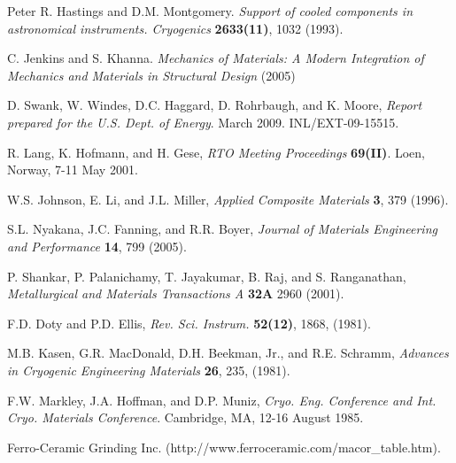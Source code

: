 \documentclass[final]{svjour2}
\begin{document}
\begin{thebibliography}{99}

Peter R. Hastings and D.M. Montgomery. {\it Support of cooled components in astronomical instruments. Cryogenics} \textbf{2633(11)}, 1032 (1993).

C. Jenkins and S. Khanna. {\it Mechanics of Materials: A Modern Integration of Mechanics and Materials in Structural Design} (2005)



D. Swank, W. Windes, D.C. Haggard, D. Rohrbaugh, and K. Moore, {\it Report prepared for the U.S. Dept. of Energy}. March 2009. INL/EXT-09-15515.

R. Lang, K. Hofmann, and H. Gese, {\it RTO Meeting Proceedings} \textbf{69(II)}. Loen, Norway, 7-11 May 2001.

W.S. Johnson, E. Li, and J.L. Miller, {\it Applied Composite Materials} \textbf{3}, 379 (1996).

S.L. Nyakana, J.C. Fanning, and R.R. Boyer, {\it Journal of Materials Engineering and Performance} \textbf{14}, 799 (2005).

P. Shankar, P. Palanichamy, T. Jayakumar, B. Raj, and S. Ranganathan, {\it Metallurgical and Materials Transactions A} \textbf{32A} 2960 (2001).

F.D. Doty and P.D. Ellis, {\it Rev. Sci. Instrum.} \textbf{52(12)}, 1868, (1981).

M.B. Kasen, G.R. MacDonald, D.H. Beekman, Jr., and R.E. Schramm, {\it Advances in Cryogenic Engineering Materials} \textbf{26}, 235, (1981).

F.W. Markley, J.A. Hoffman, and D.P. Muniz, {\it Cryo. Eng. Conference and Int. Cryo. Materials Conference}. Cambridge, MA, 12-16 August 1985.

Ferro-Ceramic Grinding Inc. (http://www.ferroceramic.com/macor\_table.htm).



\end{thebibliography}
\end{document}

